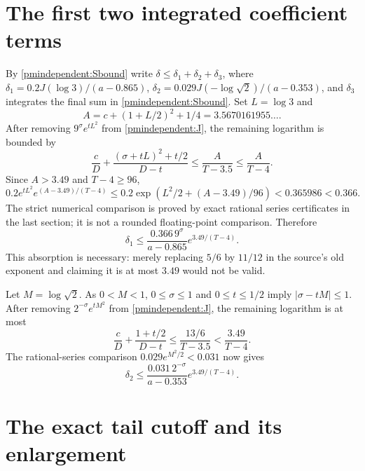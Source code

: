 \documentclass[11pt]{article}
\begin{document}
\section{The first two integrated coefficient terms}

By \eqref{pmindependent:Sbound} write $\delta\le\delta_1+\delta_2+\delta_3$,
where $\delta_1=0.2J(\log3)/(a-0.865)$,
$\delta_2=0.029J(-\log\sqrt2)/(a-0.353)$, and $\delta_3$
integrates the final sum in \eqref{pmindependent:Sbound}.
Set $L=\log3$ and
\[
 A=c+(1+L/2)^2+1/4=3.5670161955\ldots.
\]
After removing $9^\sigma e^{tL^2}$ from \eqref{pmindependent:J}, the remaining
logarithm is bounded by
\[
 \frac cD+\frac{(\sigma+tL)^2+t/2}{D-t}
 \le\frac A{T-3.5}\le\frac A{T-4}.
\]
Since $A>3.49$ and $T-4\ge96$,
\[
 0.2e^{tL^2}e^{(A-3.49)/(T-4)}
 \le0.2\exp\!\left(L^2/2+(A-3.49)/96\right)
 <0.365986<0.366.
\]
The strict numerical comparison is proved by exact rational series
certificates in the last section; it is not a rounded floating-point
comparison. Therefore
\begin{equation}\label{pmindependent:deltaone}
 \delta_1\le\frac{0.366\,9^\sigma}{a-0.865}e^{3.49/(T-4)}.
\end{equation}
This absorption is necessary: merely replacing $5/6$ by $11/12$
in the source's old exponent and claiming it is at most $3.49$
would not be valid.

Let $M=\log\sqrt2$. As $0<M<1$, $0\le\sigma\le1$ and
$0\le t\le1/2$ imply $|\sigma-tM|\le1$. After removing
$2^{-\sigma}e^{tM^2}$ from \eqref{pmindependent:J}, the remaining logarithm
is at most
\[
 \frac cD+\frac{1+t/2}{D-t}
 \le\frac{13/6}{T-3.5}<\frac{3.49}{T-4}.
\]
The rational-series comparison $0.029e^{M^2/2}<0.031$ now gives
\begin{equation}\label{pmindependent:deltatwo}
 \delta_2\le\frac{0.031\,2^{-\sigma}}{a-0.353}e^{3.49/(T-4)}.
\end{equation}

\section{The exact tail cutoff and its enlargement}
\end{document}
